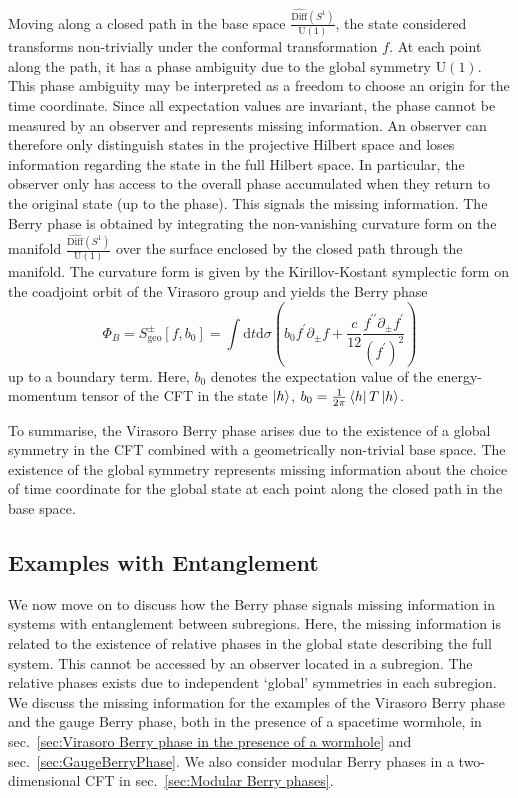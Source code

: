 \documentclass[a4paper,11pt]{article}
\renewcommand{\d}{\text{d}}
\newcommand{\U}{\text{U}}
\newcommand{\1}{\mathds{1}}
\begin{document}
Moving along a closed path in the base space $\frac{\widehat{\text{Diff}}(S^1)}{\U(1)}$, the state considered transforms non-trivially under the conformal transformation $f$.  At each point along the path, it has a phase ambiguity due to the global symmetry $\U(1)$. This phase ambiguity may be interpreted as a freedom to choose an origin for the time coordinate. Since all expectation values are invariant, the phase cannot be measured by an observer and represents missing information. An observer can therefore only distinguish states in the projective Hilbert space and loses information regarding the state in the full Hilbert space. In particular, the observer only has access to the overall phase accumulated when they return to the original state (up to the phase). This signals the missing information. The Berry phase is obtained by integrating the non-vanishing curvature form on the manifold $\frac{\widehat{\text{Diff}}(S^1)}{\U(1)}$ over the surface enclosed by the closed path through the manifold. The curvature form is given by the Kirillov-Kostant symplectic form on the coadjoint orbit of the Virasoro group and yields the Berry phase \cite{Alekseev:1988ce,Oblak:2017ect}
\begin{equation}
   \Phi_B=S_{\mathrm{geo}}^{\pm}\left[f,b_0\right]=\int\d t\d\sigma\left(b_0 f^{\prime} \partial_{\pm}f+\frac{c}{12} \frac{f^{\prime \prime} \partial_{\pm} f^{\prime}}{\left(f^{\prime}\right)^2}\right)\label{eq:Virasoro Berry phase}
\end{equation}
up to a boundary term. Here, $b_0$ denotes the expectation value of the energy-momentum tensor of the CFT in the state $\ket{h}$, $b_0=\frac{1}{2\pi}\bra{h}T\ket{h}$.

To summarise, the Virasoro Berry phase arises due to the existence of a global symmetry in the CFT combined with a geometrically non-trivial base space. The existence of the global symmetry represents missing information about the choice of time coordinate for the global state at each point along the closed path in the base space.

\subsection{Examples with Entanglement}
\label{sec:EntBerryPhasesInQFT}

We now move on to discuss how the Berry phase signals missing information in systems with entanglement between subregions. Here, the missing information is related to the existence of relative phases in the global state describing the full system. This cannot be accessed by an observer located in a subregion. The relative phases exists due to independent `global' symmetries in each subregion. We discuss the missing information for the examples of the Virasoro Berry phase and the gauge Berry phase, both in the presence of a spacetime wormhole, in sec.~\ref{sec:Virasoro Berry phase in the presence of a wormhole} and sec.~\ref{sec:GaugeBerryPhase}. We also consider modular Berry phases in a two-dimensional CFT in sec.~\ref{sec:Modular Berry phases}.
\end{document}
